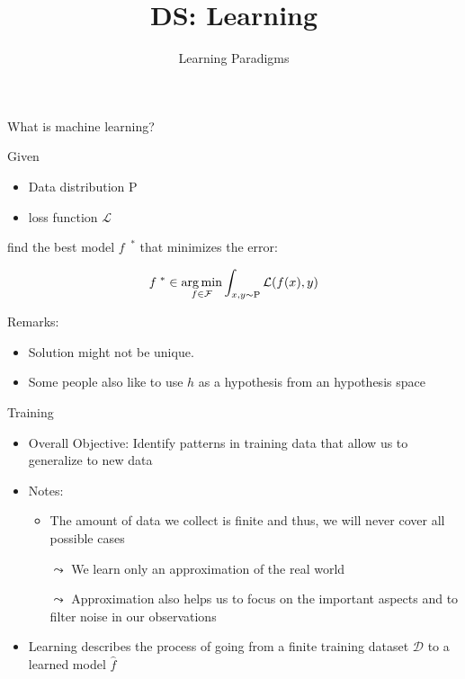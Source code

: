 \documentclass[aspectratio=169]{../latex_main/tntbeamer}  %
\title[Learning]{DS: Learning}
\subtitle{Learning Paradigms}
\begin{document}
	
    \maketitle
    
    \begin{frame}[c]{What is machine learning?}

            Given
            \begin{itemize}
                \item Data distribution $\mathrm{P}$
                \item loss function $\mathcal{L}$
            \end{itemize}
            find the best model $f^{\text{ }\ast}$ that minimizes the error:

            \begin{equation}
                f^{\text{ }\ast} \in \operatorname*{arg\,min}_{f \in \mathcal{F}} \int_{x,y \sim \mathrm{P}} \mathcal{L}(f(x), y)
            \end{equation}

        Remarks:
        \begin{itemize}
            \item Solution might not be unique.
            \item Some people also like to use $h$ as a hypothesis from an hypothesis space
        \end{itemize}
        
    \end{frame}

    \begin{frame}[c]{Training}

        \begin{itemize}
            \item \alert{Overall Objective:} Identify patterns in training data that allow us to generalize to new data
            \bigskip
            \item \alert{Notes:} 
            \begin{itemize}
                \item The amount of data we collect is finite and thus, we will never cover all possible cases
                \item[$\leadsto$] We learn only an approximation of the real world
                \item[$\leadsto$] Approximation also helps us to focus on the important aspects and to filter noise in our observations
            \end{itemize}

            \item \alert{Learning} describes the process of going from a finite training dataset $\mathcal{D}$ to a learned model $\hat{f}$
            
        \end{itemize}
        
    \end{frame}
\end{document}
